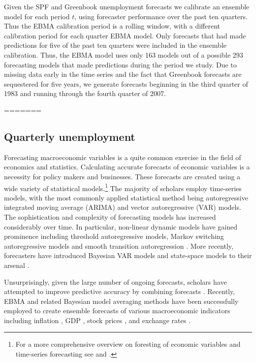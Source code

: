 \documentclass[12pt,fullpage,endnotes]{article}
\begin{document}
Given the SPF and Greenbook unemployment forecasts we calibrate an ensemble model for each period $t$, using forecaster
performance over the past ten quarters. Thus the EBMA calibration period is a rolling window, with a different calibration period for each quarter EBMA model. Only forecasts that had made
predictions for five of the past ten quarters were included in the ensemble calibration.
Thus, the EBMA model uses only 163 models out of a possible 293
forecasting models that made predictions during the period we study.
Due to missing data early in the time series and the fact that Greenbook forecasts are
sequestered for five years, we generate forecasts beginning in the
third quarter of 1983 and running through the fourth quarter of 2007.

=======
\subsection{Quarterly unemployment}
Forecasting macroeconomic variables is a quite common exercise in the
field of economics and statistics. Calculating accurate forecasts of
economic variables is a necessity for policy makers and
businesses. These forecasts are created using a wide variety of
statistical models.\footnote{For a more comprehensive overview on
  foresting of economic variables and time-series forecasting see
  \citet{Elliott:Timmermann:2008} and \citet{Goijer:Hyndman:2006}.}
The majority of scholars employ time-series models, with the most
commonly applied statistical method being autoregressive integrated
moving average (ARIMA) and vector autoregressive (VAR) models. The
sophistication and complexity of forecasting models has increased
considerably over time. In particular, non-linear dynamic models have
gained prominence including threshold autoregressive models, Markov
switching autoregressive models and smooth transition autoregression
\citep{Elliott:Timmermann:2008,Montgomery:etal:1998}. More recently,
forecasters have introduced Bayesian VAR models and state-space models
to their arsenal \citep{Goijer:Hyndman:2006,Elliott:Timmermann:2008}.

Unsurprisingly, given the large number of ongoing forecasts, scholars
have attempted to improve predictive accuracy by combining forecasts
\citet{Bates:1969, Palm:Zellner:1992, Elliott:Timmermann:2008}.
Recently, EBMA and related Bayesian model averaging methods have been
successfully employed to create ensemble forecasts of various
macroeconomic indicators including inflation
\citep{Koop:2010,Wright:2009}, GDP \citep{Billio:2010}, stock prices
\citep{Billio:2011}, and exchange rates \citep{Wright:2008}.
\end{document}
